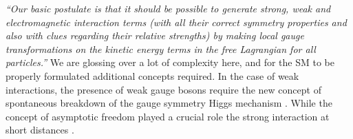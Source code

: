 \textit{“Our basic postulate is that it should be possible to generate strong,  weak and electromagnetic  interaction terms (with all their correct symmetry properties and also with clues regarding their relative strengths) by making local gauge transformations on the kinetic energy terms in the free Lagrangian for all particles.”}
We are glossing over a lot of complexity here, and for the SM to be properly formulated\Joaoadd{,} additional concepts  required. In the case of  weak interactions, the presence of  weak gauge bosons require the new concept of spontaneous breakdown of the gauge symmetry  Higgs mechanism \cite{higgs1964broken,englert1964broken,guralnik1964global} . 
%
While the concept of asymptotic freedom played a crucial role  the strong interaction at short distances \cite{politzer1973reliable,gross1973ultraviolet} .  


